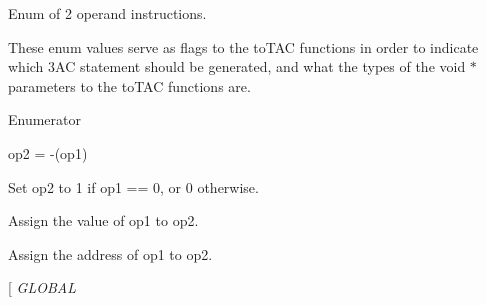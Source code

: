 Enum of 2 operand instructions. 

These enum values serve as flags to the to\-T\-A\-C functions in order to indicate which 3\-A\-C statement should be generated, and what the types of the void $\ast$ parameters to the to\-T\-A\-C functions are. \begin{Desc}
\item[Enumerator]\par
\begin{description}
\item[{\em 
\hypertarget{classTAC__Generator_a4e5a63c4a55a85d34f6ffebe5bf48129a308b492d7046c1f465e6219b0bf7bce8}{N\-E\-G}\label{classTAC__Generator_a4e5a63c4a55a85d34f6ffebe5bf48129a308b492d7046c1f465e6219b0bf7bce8}
}]op2 = -\/(op1) \item[{\em 
\hypertarget{classTAC__Generator_a4e5a63c4a55a85d34f6ffebe5bf48129a05adc6809a4b013f033bba555e2bafde}{N\-O\-T}\label{classTAC__Generator_a4e5a63c4a55a85d34f6ffebe5bf48129a05adc6809a4b013f033bba555e2bafde}
}]Set op2 to 1 if op1 == 0, or 0 otherwise. \item[{\em 
\hypertarget{classTAC__Generator_a4e5a63c4a55a85d34f6ffebe5bf48129a0aa9de21ced06e060900ea369cd0a203}{A\-S\-S\-I\-G\-N}\label{classTAC__Generator_a4e5a63c4a55a85d34f6ffebe5bf48129a0aa9de21ced06e060900ea369cd0a203}
}]Assign the value of op1 to op2. \item[{\em 
\hypertarget{classTAC__Generator_a4e5a63c4a55a85d34f6ffebe5bf48129aac4fd25c8abf0189d06c229ec73dc7a9}{A\-D\-D\-R}\label{classTAC__Generator_a4e5a63c4a55a85d34f6ffebe5bf48129aac4fd25c8abf0189d06c229ec73dc7a9}
}]Assign the address of op1 to op2. \item[{\em 
\hypertarget{classTAC__Generator_a4e5a63c4a55a85d34f6ffebe5bf48129a64cc4e8dc4e7ed616ee752e2dbd10542}{G\-L\-O\-B\-A\-L}\label{classTAC__Generator_a4e5a63c4a55a85d34f6ffebe5bf48129a64cc4e8dc4e7ed616ee752e2dbd10542}
}
\end{description}
\end{Desc}
